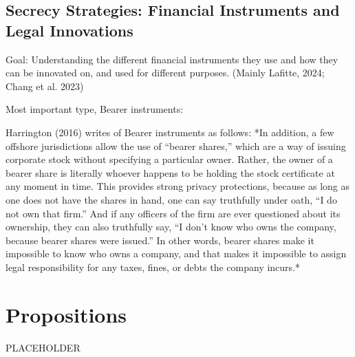 \subsection{Secrecy Strategies: Financial Instruments and Legal Innovations}
\label{subsec:2_1_5}

Goal: Understanding the different financial instruments they use and how they can be innovated on, and used for different purposes. (Mainly Lafitte, 2024; Chang et al. 2023)


Most important type, Bearer instruments:

Harrington (2016) writes of Bearer instruments as follows:
*In addition, a few offshore jurisdictions allow the use of “bearer shares,” which are a way of issuing corporate stock without specifying a particular owner. Rather, the owner of a bearer share is literally whoever happens to be holding the stock certificate at any moment in time. This provides strong privacy protections, because as long as one does not have the shares in hand, one can say truthfully under oath, “I do not own that firm.” And if any officers of the firm are ever questioned about its ownership, they can also truthfully say, “I don’t know who owns the company, because bearer shares were issued.” In other words, bearer shares make it impossible to know who owns a company, and that makes it impossible to assign legal responsibility for any taxes, fines, or debts the company incurs.*


\section{Propositions}
\label{sec:2_2}

PLACEHOLDER






